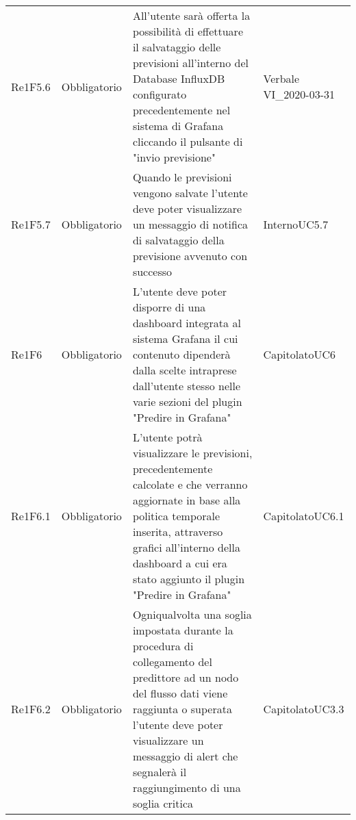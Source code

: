 \begin{longtable}{C{3cm} C{3cm} L{5.5cm} C{3cm}}
Re1F5.6 & Obbligatorio & All'utente sarà offerta la possibilità di effettuare il salvataggio delle previsioni all'interno del Database InfluxDB configurato precedentemente nel sistema di Grafana cliccando il pulsante di "invio previsione" &  Verbale VI\_2020-03-31\\
Re1F5.7 & Obbligatorio & Quando le previsioni vengono salvate l'utente deve poter visualizzare un messaggio di notifica di salvataggio della previsione avvenuto con successo &  Interno\newline UC5.7\\
Re1F6 & Obbligatorio & L'utente deve poter disporre di una dashboard integrata al sistema Grafana il cui contenuto dipenderà dalla scelte intraprese dall'utente stesso nelle varie sezioni del plugin "Predire in Grafana" & Capitolato\newline UC6\\
Re1F6.1 & Obbligatorio & L'utente potrà visualizzare le previsioni, precedentemente calcolate e che verranno aggiornate in base alla politica temporale inserita, attraverso grafici all'interno della dashboard a cui era stato aggiunto il plugin "Predire in Grafana" &  Capitolato\newline UC6.1\\
Re1F6.2 & Obbligatorio & Ogniqualvolta una soglia impostata durante la procedura di collegamento del predittore ad un nodo del flusso dati viene raggiunta o superata l'utente deve poter visualizzare un messaggio di alert che segnalerà il raggiungimento di una soglia critica &  Capitolato\newline UC3.3\\


\end{longtable}
